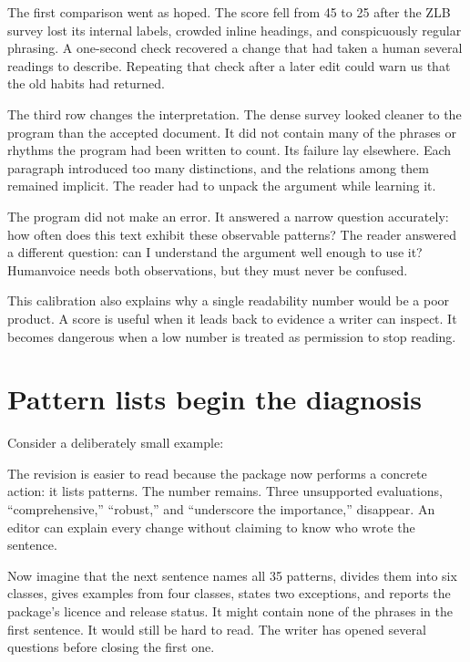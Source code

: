 The first comparison went as hoped. The score fell from 45 to 25 after the ZLB
survey lost its internal labels, crowded inline headings, and conspicuously
regular phrasing. A one-second check recovered a change that had taken a human
several readings to describe. Repeating that check after a later edit could
warn us that the old habits had returned.

The third row changes the interpretation. The dense survey looked cleaner to
the program than the accepted document. It did not contain many of the phrases
or rhythms the program had been written to count. Its failure lay elsewhere.
Each paragraph introduced too many distinctions, and the relations among them
remained implicit. The reader had to unpack the argument while learning it.

The program did not make an error. It answered a narrow question accurately:
how often does this text exhibit these observable patterns? The reader answered
a different question: can I understand the argument well enough to use it?
Humanvoice needs both observations, but they must never be confused.

\hvFigureScoreBoundary

This calibration also explains why a single readability number would be a
poor product. A score is useful when it leads back to evidence a writer can
inspect. It becomes dangerous when a low number is treated as permission to
stop reading.

\section{Pattern lists begin the diagnosis}
\label{sec:oss-humanizer}

Consider a deliberately small example:

\begin{repairpair}
\end{repairpair}

The revision is easier to read because the package now performs a concrete
action: it lists patterns. The number remains. Three unsupported evaluations,
``comprehensive,'' ``robust,'' and ``underscore the importance,'' disappear.
An editor can explain every change without claiming to know who wrote the
sentence.

Now imagine that the next sentence names all 35 patterns, divides them into
six classes, gives examples from four classes, states two exceptions, and
reports the package's licence and release status. It might contain none of the
phrases in the first sentence. It would still be hard to read. The writer has
opened several questions before closing the first one.


